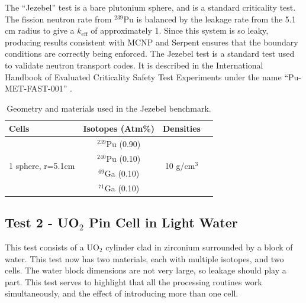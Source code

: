 \documentclass[preprint,12pt]{elsarticle}
\begin{document}
The ``Jezebel'' test is a bare plutonium sphere, and is a standard criticality test.   The fission neutron rate from $^{239}$Pu is balanced by the leakage rate from the 5.1 cm radius to give a $k_\mathrm{eff}$ of approximately 1.  Since this system is so leaky, producing results consistent with MCNP and Serpent ensures that the boundary conditions are correctly being enforced.  The Jezebel test is a standard test used to validate neutron transport codes.  It is described in the International Handbook of Evaluated Criticality Safety Test Experiments under the name ``Pu-MET-FAST-001'' \cite{bench_handbook}.  

\begin{table}[h]
\centering
\caption{Geometry and materials used in the Jezebel benchmark.}
\label{jezebel_geom}
\begin{tabular}{| l | c | c | c |}
\hline
Cells & Isotopes (Atm\%)& Densities \\
\hline
\multirow{4}{*}{1 sphere, r=5.1cm }  &   $^{239}$Pu   (0.90) &    \multirow{4}{*}{10 g/cm$^3$} \\
&  $^{240}$Pu (0.10)& \\
&  $^{69}$Ga  (0.10)& \\
&  $^{71}$Ga (0.10) & \\ 
\hline
\end{tabular}
\end{table}

\subsection{Test 2 - UO$_2$ Pin Cell in Light Water}

This test consists of a UO$_2$ cylinder clad in zirconium surrounded by a block of water.  This test now has two materials, each with multiple isotopes, and two cells.  The water block dimensions are not very large, so leakage should play a part.  This test serves to highlight that all the processing routines work simultaneously, and the effect of introducing more than one cell.
\end{document}
